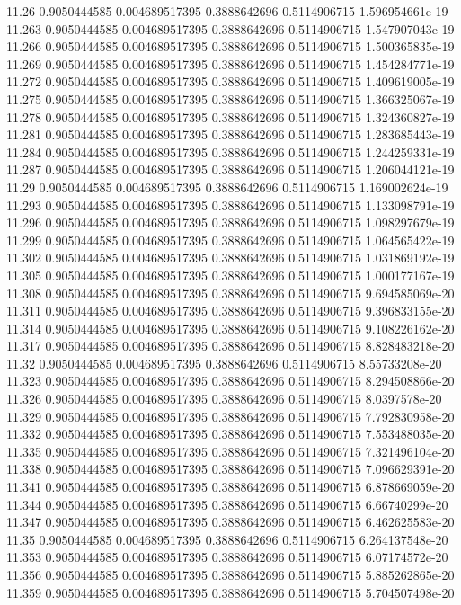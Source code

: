 {11.26 0.9050444585 0.004689517395 0.3888642696 0.5114906715 1.596954661e-19
11.263 0.9050444585 0.004689517395 0.3888642696 0.5114906715 1.547907043e-19
11.266 0.9050444585 0.004689517395 0.3888642696 0.5114906715 1.500365835e-19
11.269 0.9050444585 0.004689517395 0.3888642696 0.5114906715 1.454284771e-19
11.272 0.9050444585 0.004689517395 0.3888642696 0.5114906715 1.409619005e-19
11.275 0.9050444585 0.004689517395 0.3888642696 0.5114906715 1.366325067e-19
11.278 0.9050444585 0.004689517395 0.3888642696 0.5114906715 1.324360827e-19
11.281 0.9050444585 0.004689517395 0.3888642696 0.5114906715 1.283685443e-19
11.284 0.9050444585 0.004689517395 0.3888642696 0.5114906715 1.244259331e-19
11.287 0.9050444585 0.004689517395 0.3888642696 0.5114906715 1.206044121e-19
11.29 0.9050444585 0.004689517395 0.3888642696 0.5114906715 1.169002624e-19
11.293 0.9050444585 0.004689517395 0.3888642696 0.5114906715 1.133098791e-19
11.296 0.9050444585 0.004689517395 0.3888642696 0.5114906715 1.098297679e-19
11.299 0.9050444585 0.004689517395 0.3888642696 0.5114906715 1.064565422e-19
11.302 0.9050444585 0.004689517395 0.3888642696 0.5114906715 1.031869192e-19
11.305 0.9050444585 0.004689517395 0.3888642696 0.5114906715 1.000177167e-19
11.308 0.9050444585 0.004689517395 0.3888642696 0.5114906715 9.694585069e-20
11.311 0.9050444585 0.004689517395 0.3888642696 0.5114906715 9.396833155e-20
11.314 0.9050444585 0.004689517395 0.3888642696 0.5114906715 9.108226162e-20
11.317 0.9050444585 0.004689517395 0.3888642696 0.5114906715 8.828483218e-20
11.32 0.9050444585 0.004689517395 0.3888642696 0.5114906715 8.55733208e-20
11.323 0.9050444585 0.004689517395 0.3888642696 0.5114906715 8.294508866e-20
11.326 0.9050444585 0.004689517395 0.3888642696 0.5114906715 8.0397578e-20
11.329 0.9050444585 0.004689517395 0.3888642696 0.5114906715 7.792830958e-20
11.332 0.9050444585 0.004689517395 0.3888642696 0.5114906715 7.553488035e-20
11.335 0.9050444585 0.004689517395 0.3888642696 0.5114906715 7.321496104e-20
11.338 0.9050444585 0.004689517395 0.3888642696 0.5114906715 7.096629391e-20
11.341 0.9050444585 0.004689517395 0.3888642696 0.5114906715 6.878669059e-20
11.344 0.9050444585 0.004689517395 0.3888642696 0.5114906715 6.66740299e-20
11.347 0.9050444585 0.004689517395 0.3888642696 0.5114906715 6.462625583e-20
11.35 0.9050444585 0.004689517395 0.3888642696 0.5114906715 6.264137548e-20
11.353 0.9050444585 0.004689517395 0.3888642696 0.5114906715 6.07174572e-20
11.356 0.9050444585 0.004689517395 0.3888642696 0.5114906715 5.885262865e-20
11.359 0.9050444585 0.004689517395 0.3888642696 0.5114906715 5.704507498e-20
}
